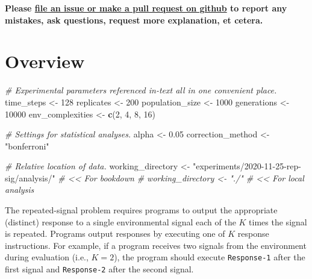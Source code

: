 \documentclass[
]{book}
\newenvironment{Shaded}{\begin{snugshade}}{\end{snugshade}}
\newcommand{\CommentTok}[1]{\textcolor[rgb]{0.56,0.35,0.01}{\textit{#1}}}
\newcommand{\DecValTok}[1]{\textcolor[rgb]{0.00,0.00,0.81}{#1}}
\newcommand{\FloatTok}[1]{\textcolor[rgb]{0.00,0.00,0.81}{#1}}
\newcommand{\KeywordTok}[1]{\textcolor[rgb]{0.13,0.29,0.53}{\textbf{#1}}}
\newcommand{\NormalTok}[1]{#1}
\newcommand{\StringTok}[1]{\textcolor[rgb]{0.31,0.60,0.02}{#1}}
\begin{document}
\textbf{Please \href{https://github.com/amlalejini/Tag-based-Genetic-Regulation-for-LinearGP/issues}{file an issue or make a pull request on github} to report any mistakes, ask questions, request more explanation, et cetera.}

\hypertarget{overview-1}{%
\section{Overview}\label{overview-1}}

\begin{Shaded}
\begin{Highlighting}[]
\CommentTok{\# Experimental parameters referenced in{-}text all in one convenient place.}
\NormalTok{time\_steps \textless{}{-}}\StringTok{ }\DecValTok{128}
\NormalTok{replicates \textless{}{-}}\StringTok{ }\DecValTok{200}
\NormalTok{population\_size \textless{}{-}}\StringTok{ }\DecValTok{1000}
\NormalTok{generations \textless{}{-}}\StringTok{ }\DecValTok{10000}
\NormalTok{env\_complexities \textless{}{-}}\StringTok{ }\KeywordTok{c}\NormalTok{(}\DecValTok{2}\NormalTok{, }\DecValTok{4}\NormalTok{, }\DecValTok{8}\NormalTok{, }\DecValTok{16}\NormalTok{)}

\CommentTok{\# Settings for statistical analyses.}
\NormalTok{alpha \textless{}{-}}\StringTok{ }\FloatTok{0.05}
\NormalTok{correction\_method \textless{}{-}}\StringTok{ "bonferroni"}

\CommentTok{\# Relative location of data.}
\NormalTok{working\_directory \textless{}{-}}\StringTok{ "experiments/2020{-}11{-}25{-}rep{-}sig/analysis/"} \CommentTok{\# \textless{}\textless{} For bookdown}
\CommentTok{\# working\_directory \textless{}{-} "./"                                     \# \textless{}\textless{} For local analysis}
\end{Highlighting}
\end{Shaded}

The repeated-signal problem requires programs to output the appropriate (distinct) response to a single environmental signal each of the \(K\) times the signal is repeated.
Programs output responses by executing one of \(K\) response instructions.
For example, if a program receives two signals from the environment during evaluation (i.e., \(K=2\)), the program should execute \texttt{Response-1} after the first signal and \texttt{Response-2} after the second signal.
\end{document}

